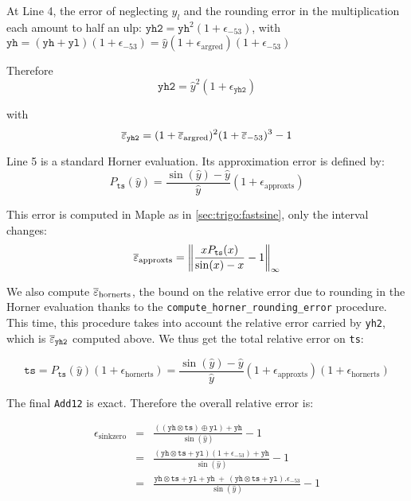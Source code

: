 At Line 4, the error of neglecting $y_l$ and the rounding error in the
multiplication each amount to half an ulp:
  $\mathtt{yh2}=\mathtt{yh}^2(1+\epsilon_{-53})$, 
 with $\mathtt{yh} = (\mathtt{yh}+\mathtt{yl})(1+\epsilon_{-53}) = \hat{y}(1+\epsilon_{\mathrm{argred}})(1+\epsilon_{-53})$

Therefore
\begin{equation}
  \mathtt{yh2}=\hat{y}^2(1+\epsilon_{\mathtt{yh2}})
\end{equation}

with
\begin{equation}
  {\overline{\varepsilon}}_{\mathtt{yh2}} = (1+{\overline{\varepsilon}}_{\mathrm{argred}})^2(1+{\overline{\varepsilon}}_{-53})^3 - 1
\end{equation}

Line 5 is a standard Horner evaluation. Its approximation error is defined by: 
$$
P_{\mathtt{ts}}(\hat{y}) = \frac{\sin(\hat{y})-\hat{y}}{\hat{y}}(1+\epsilon_{\mathrm{approxts}})
$$

This error is computed in Maple as in \ref{sec:trigo:fastsine}, only the interval changes:
$${\overline{\varepsilon}}_{\mathrm{approxts}} = \left\Vert \frac{xP_{\mathtt{ts}}(x)}{\sin(x)-x} -1 \right\Vert_{\infty}$$

We also compute ${\overline{\varepsilon}}_{\mathrm{hornerts}}$, the bound on the relative error due
to rounding in the Horner evaluation thanks to the
\texttt{compute\_horner\_rounding\_error} procedure. This time, this procedure 
takes into account the relative error carried by \texttt{yh2}, which is
${\overline{\varepsilon}}_{\mathtt{yh2}}$ computed above.
We thus get the total relative error on \texttt{ts}:

\begin{equation}
  \mathtt{ts} = P_{\mathtt{ts}}(\hat{y})(1+\epsilon_{\mathrm{hornerts}}) = \frac{\sin(\hat{y})-\hat{y}}{\hat{y}}(1+\epsilon_{\mathrm{approxts}})(1+\epsilon_{\mathrm{hornerts}})
  \label{eq:sink0ts}
\end{equation}

The final \texttt{Add12} is exact. Therefore the overall relative error is:

\begin{eqnarray*}
  \epsilon_{\mathrm{sinkzero}} 
  &=& \frac{((\mathtt{yh}\otimes \mathtt{ts}) \oplus \mathtt{yl}) + \mathtt{yh}}{\sin(\hat{y})} -1 \\
  &=& \frac{(\mathtt{yh}\otimes\mathtt{ts} + \mathtt{yl})(1+\epsilon_{-53}) + \mathtt{yh}}{\sin(\hat{y})} -1\\
  &=& \frac{\mathtt{yh}\otimes\mathtt{ts} + \mathtt{yl} + \mathtt{yh}    \ +\  (\mathtt{yh}\otimes\mathtt{ts} + \mathtt{yl}).\epsilon_{-53}}{\sin(\hat{y})} -1\\
\end{eqnarray*}

